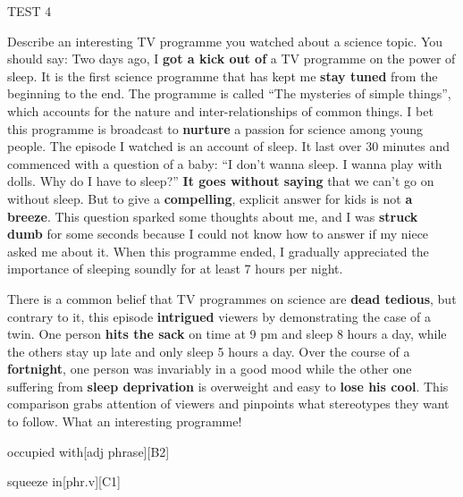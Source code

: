 \begin{glossarymc}[Cambridge 15]
\begin{test}{TEST 4}
\begin{qa}{Describe an interesting TV programme you watched about a science topic. You should say:}
    Two days ago, I \textbf{got a kick out of} a TV programme on the power of sleep. It is the first science programme that has kept me \textbf{stay tuned} from the beginning to the end. The programme is called “The mysteries of simple things”, which accounts for the nature and inter-relationships of common things. I bet this programme is broadcast to \textbf{nurture} a passion for science among young people. The episode I watched is an account of sleep. It last over 30 minutes and commenced with a question of a baby: “I don’t wanna sleep. I wanna play with dolls. Why do I have to sleep?” \textbf{It goes without saying} that we can’t go on without sleep. But to give a \textbf{compelling}, explicit answer for kids is not \textbf{a breeze}. This question sparked some thoughts about me, and I was \textbf{struck dumb} for some seconds because I could not know how to answer if my niece asked me about it. When this programme ended, I gradually appreciated the importance of sleeping soundly for at least 7 hours per night.

    There is a common belief that TV programmes on science are \textbf{dead tedious}, but contrary to it, this episode \textbf{intrigued} viewers by demonstrating the case of a twin. One person \textbf{hits the sack} on time at 9 pm and sleep 8 hours a day, while the others stay up late and only sleep 5 hours a day. Over the course of a \textbf{fortnight}, one person was invariably in a good mood while the other one suffering from \textbf{sleep deprivation} is overweight and easy to \textbf{lose his cool}. This comparison grabs attention of viewers and pinpoints what stereotypes they want to follow. What an interesting programme!
    \end{qa}

        \begin{VocabExplain}[Part 2]
            \begin{ExplainCard}{occupied with}[adj phrase][B2]
            \end{ExplainCard}

            \begin{ExplainCard}{squeeze in}[phr.v][C1]
            \end{ExplainCard}


\end{VocabExplain}
\end{test}
\end{glossarymc}
